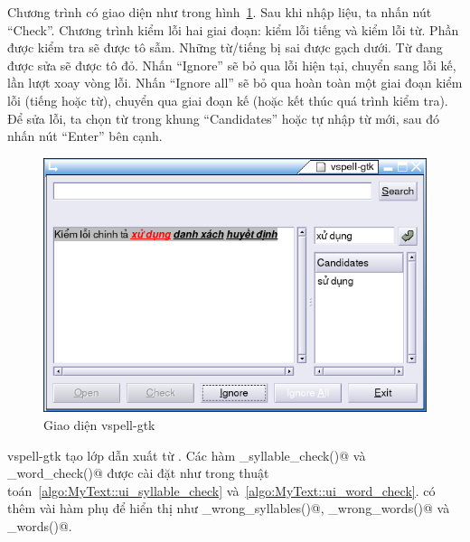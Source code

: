 \documentclass[a4paper,oneside,14pt]{extbook} %
\begin{document}
Chương trình có giao diện như trong
hình~\ref{fig:vspell-gtk-ui}. Sau khi nhập liệu, ta nhấn nút
``Check''. Chương trình kiểm lỗi hai giai đoạn: kiểm lỗi tiếng và kiểm
lỗi từ. Phần được kiểm tra sẽ được tô sẫm. Những từ/tiếng bị sai được
gạch dưới. Từ đang được sửa sẽ được tô đỏ. Nhấn ``Ignore'' sẽ bỏ qua
lỗi hiện tại, chuyển sang lỗi kế, lần lượt xoay vòng lỗi. Nhấn
``Ignore all'' sẽ bỏ qua hoàn toàn một giai đoạn kiểm lỗi (tiếng hoặc
từ), chuyển qua giai đoạn kế (hoặc kết thúc quá trình kiểm tra). Để
sửa lỗi, ta chọn từ trong khung ``Candidates'' hoặc tự nhập từ mới,
sau đó nhấn nút ``Enter'' bên cạnh.
\begin{figure}[htbp]
  \centering
  \includegraphics[width=\textwidth]{vspell-gtk}
  \caption{Giao diện vspell-gtk}
  \label{fig:vspell-gtk-ui}
\end{figure}

vspell-gtk tạo lớp \verb@MyText@ dẫn xuất từ \verb@Text@. Các hàm
\verb@ui_syllable_check()@ và \verb@ui_word_check()@ được cài đặt như
trong thuật toán~\ref{algo:MyText::ui_syllable_check}
và~\ref{algo:MyText::ui_word_check}. \verb@MyText@ có thêm vài hàm phụ
để hiển thị như \verb@show_wrong_syllables()@,
\verb@show_wrong_words()@ và \verb@show_words()@.
\end{document}
